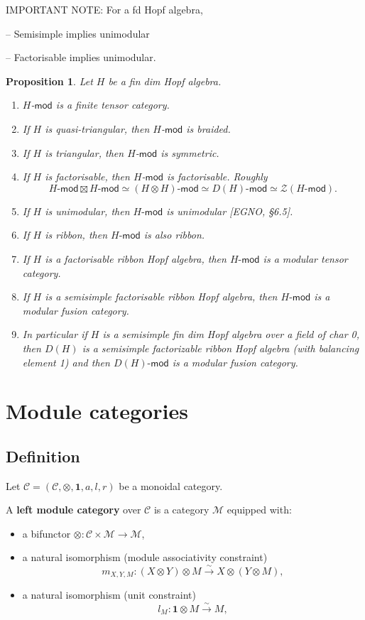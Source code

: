 \documentclass[11pt]{article}
\newtheorem{proposition}[theorem]{Proposition}
\theoremstyle{definition}
\begin{document}
IMPORTANT NOTE: For a fd Hopf algebra, 

-- Semisimple implies unimodular

-- Factorisable implies unimodular.


\begin{proposition} Let $H$ be a fin dim Hopf algebra.
\begin{enumerate}
\item $H$-$\mathsf{mod}$ is a finite tensor category.
\item If $H$ is  quasi-triangular, then $H$-$\mathsf{mod}$ is braided.
\item If $H$ is  triangular, then $H$-$\mathsf{mod}$ is symmetric.
\item If $H$ is factorisable, then $H$-$\mathsf{mod}$ is factorisable. Roughly $$ H\text{-}\mathsf{mod}  \boxtimes H\text{-}\mathsf{mod}  \simeq (H \otimes H)\text{-}\mathsf{mod}  \simeq D(H)\text{-}\mathsf{mod} \simeq \mathcal{Z}(H\text{-}\mathsf{mod}  ).  $$
\item If $H$ is unimodular, then $H\text{-}\mathsf{mod}  $ is unimodular [EGNO, \S 6.5].
\item If $H$ is ribbon, then  $H\text{-}\mathsf{mod}  $ is also ribbon.
\item If $H$ is a factorisable ribbon Hopf algebra, then $H\text{-}\mathsf{mod}  $ is a modular tensor category.
\item If $H$ is a semisimple factorisable ribbon Hopf algebra, then $H\text{-}\mathsf{mod}  $ is a modular fusion category.
\item In particular if $H$ is a semisimple fin dim Hopf algebra over a field of char 0, then $D(H)$ is a semisimple factorizable ribbon Hopf algebra (with balancing element 1) and then $D(H)\text{-}\mathsf{mod}  $ is a modular fusion category.
\end{enumerate}
\end{proposition}



\section{ Module categories}

\subsection{ Definition}
Let \( \mathcal{C} = (\mathcal{C}, \otimes, \mathbf{1}, a, l, r) \) be a monoidal category.

A \textbf{left module category} over \( \mathcal{C} \) is a category \( \mathcal{M} \) equipped with:
\begin{itemize}
  \item a bifunctor \( \otimes : \mathcal{C} \times \mathcal{M} \to \mathcal{M} \),
  \item a natural isomorphism (module associativity constraint)
  \[
  m_{X,Y,M} : (X \otimes Y) \otimes M \xrightarrow{\sim} X \otimes (Y \otimes M),
  \]
  \item a natural isomorphism (unit constraint)
  \[
  l_M : \mathbf{1} \otimes M \xrightarrow{\sim} M,
  \]
\end{itemize}
\end{document}
